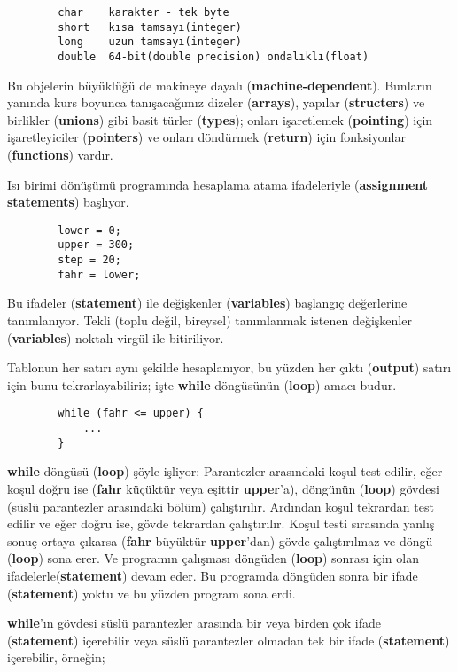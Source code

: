\documentclass[a4paper,12pt,oneside]{book}
\begin{document}
\begin{lstlisting}
        char    karakter - tek byte
        short   kısa tamsayı(integer)
        long    uzun tamsayı(integer)
        double  64-bit(double precision) ondalıklı(float)
\end{lstlisting}
Bu objelerin büyüklüğü de makineye dayalı (\textbf{machine-dependent}). Bunların yanında kurs boyunca tanışacağımız dizeler (\textbf{arrays}), yapılar (\textbf{structers}) ve birlikler (\textbf{unions}) gibi basit türler (\textbf{types}); onları işaretlemek (\textbf{pointing}) için işaretleyiciler (\textbf{pointers}) ve onları döndürmek (\textbf{return}) için fonksiyonlar (\textbf{functions}) vardır. \pagebreak
\par Isı birimi dönüşümü programında hesaplama atama ifadeleriyle (\textbf{assignment statements}) başlıyor.
\begin{lstlisting}
        lower = 0;
        upper = 300;
        step = 20;
        fahr = lower;
\end{lstlisting}
Bu ifadeler (\textbf{statement}) ile değişkenler (\textbf{variables}) başlangıç değerlerine tanımlanıyor. Tekli (toplu değil, bireysel) tanımlanmak istenen değişkenler (\textbf{variables}) noktalı virgül ile bitiriliyor.
\par Tablonun her satırı aynı şekilde hesaplanıyor, bu yüzden her çıktı (\textbf{output}) satırı için bunu tekrarlayabiliriz; işte \textbf{while} döngüsünün (\textbf{loop}) amacı budur.
\begin{lstlisting}
        while (fahr <= upper) {
            ...
        }
\end{lstlisting}
\textbf{while} döngüsü (\textbf{loop}) şöyle işliyor: Parantezler arasındaki koşul test edilir, eğer koşul doğru ise (\textbf{fahr} küçüktür veya eşittir \textbf{upper}'a), döngünün (\textbf{loop}) gövdesi (süslü parantezler arasındaki bölüm) çalıştırılır. Ardından koşul tekrardan test edilir ve eğer doğru ise, gövde tekrardan çalıştırılır. Koşul testi sırasında yanlış sonuç ortaya çıkarsa (\textbf{fahr} büyüktür \textbf{upper}'dan) gövde çalıştırılmaz ve döngü (\textbf{loop}) sona erer. Ve programın çalışması döngüden (\textbf{loop}) sonrası için olan ifadelerle(\textbf{statement}) devam eder. Bu programda döngüden sonra bir ifade (\textbf{statement}) yoktu ve bu yüzden program sona erdi.
\par \textbf{while}'ın gövdesi süslü parantezler arasında bir veya birden çok ifade (\textbf{statement}) içerebilir veya süslü parantezler olmadan tek bir ifade (\textbf{statement}) içerebilir, örneğin;
\end{document}
